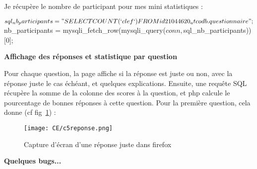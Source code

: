\documentclass[11pt]{article}
\begin{document}
Je récupère le nombre de participant pour mes mini statistiques :
\smallskip
\begin{code3}
$sql_nb_participants = "SELECT COUNT(`clef`) FROM id21044620_atcodb.questionnaire";
$nb_participants = mysqli_fetch_row(mysqli_query($conn, $sql_nb_participants))[0];\end{code3}

\textbf{Affichage des réponses et statistique par question}

Pour chaque question, la page affiche si la réponse est juste ou non, avec la réponse juste le cas échéant, et quelques explications. Ensuite, une requête SQL récupère la somme de la colonne des scores à la question, et php calcule le pourcentage de bonnes réponses à cette question. Pour la première question, cela donne (cf fig~\ref{c5reponse}) :
\smallskip
{}

\begin{figure}[h]
		\texttt{[image: CE/c5reponse.png]}
		\caption{Capture d’écran d’une réponse juste dans firefox}
		\label{c5reponse}
		\end{figure}	
		
\textbf{Quelques bugs...}
\end{document}
